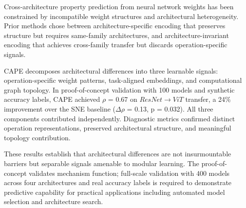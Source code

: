 
Cross-architecture property prediction from neural network weights has been constrained by incompatible weight structures and architectural heterogeneity. Prior methods chose between architecture-specific encoding that preserves structure but requires same-family architectures, and architecture-invariant encoding that achieves cross-family transfer but discards operation-specific signals.

CAPE decomposes architectural differences into three learnable signals: operation-specific weight patterns, task-aligned embeddings, and computational graph topology. In proof-of-concept validation with 100 models and synthetic accuracy labels, CAPE achieved $\rho$ = 0.67 on $ResNet\rightarrow ViT$ transfer, a 24\% improvement over the SNE baseline ($\Delta\rho$ = 0.13, p = 0.032). All three components contributed independently. Diagnostic metrics confirmed distinct operation representations, preserved architectural structure, and meaningful topology contribution.

These results establish that architectural differences are not insurmountable barriers but separable signals amenable to modular learning. The proof-of-concept validates mechanism function; full-scale validation with 400 models across four architectures and real accuracy labels is required to demonstrate predictive capability for practical applications including automated model selection and architecture search.
